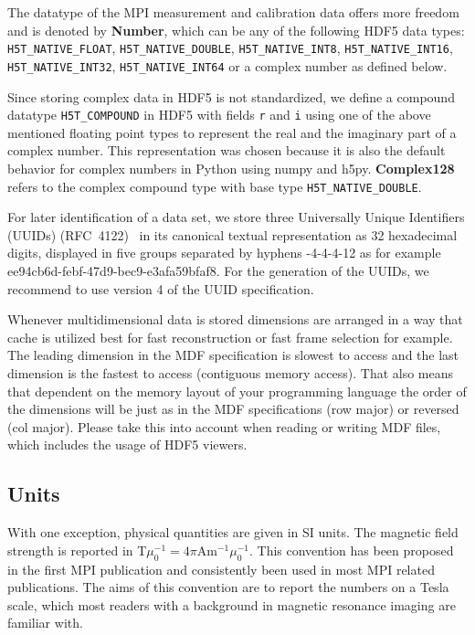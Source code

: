 \documentclass[landscape,a4paper]{article} %
\newcommand{\inl}[1]{\lstinline[columns=fixed]{#1}}
\newcommand{\inltab}[1]{{\ttfamily\bfseries\color{blue}#1}}
\newcommand{\inlvar}[1]{{\ttfamily#1}}
\begin{document}
\begin{multicols}{2}
The datatype of the MPI measurement and calibration data offers more freedom and is denoted by \inltab{Number}, which can be any of the following HDF5 data types: \inl{H5T_NATIVE_FLOAT}, \mbox{\inl{H5T_NATIVE_DOUBLE},} \inl{H5T_NATIVE_INT8}, \inl{H5T_NATIVE_INT16}, \inl{H5T_NATIVE_INT32}, \inl{H5T_NATIVE_INT64} or a complex number as defined below. 

Since storing complex data in HDF5 is not standardized, we define a compound datatype \inl{H5T_COMPOUND} in HDF5 with fields \inl{r} and \inl{i} using one of the above mentioned floating point types to represent the real and the imaginary part of a complex number. This representation was chosen because it is also the default behavior for complex numbers in Python using numpy and h5py. \inltab{Complex128} refers to the complex compound type with base type \inl{H5T_NATIVE_DOUBLE}.

For later identification of a data set, we store three Universally Unique Identifiers (UUIDs) (RFC~4122)~\cite{leach2005universally} in its canonical textual representation as 32 hexadecimal digits, displayed in five groups separated by hyphens \inlvar{8-4-4-4-12} as for example \inlvar{ee94cb6d-febf-47d9-bec9-e3afa59bfaf8}. For the generation of the UUIDs, we recommend to use version 4 of the UUID specification.

Whenever multidimensional data is stored dimensions are arranged in a way that cache is utilized best for fast reconstruction or fast frame selection for example. The leading dimension in the MDF specification is slowest to access and the last dimension is the fastest to access (contiguous memory access). That also means that dependent on the memory layout of your programming language the order of the dimensions will be just as in the MDF specifications (row major) or reversed (col major). Please take this into account when reading or writing MDF files, which includes the usage of HDF5 viewers.

\subsection{Units}

With one exception, physical quantities are given in SI units. The magnetic field strength is reported in T$\mu_0^{-1} = 4 \pi$Am$^{-1}\mu_0^{-1}$. This convention has been proposed in the first MPI publication \cite{Gleich2005} and consistently been used in most MPI related publications. The aims of this convention are to report the numbers on a Tesla scale, which most readers with a background in magnetic resonance imaging are familiar with.


\end{multicols}
\end{document}
